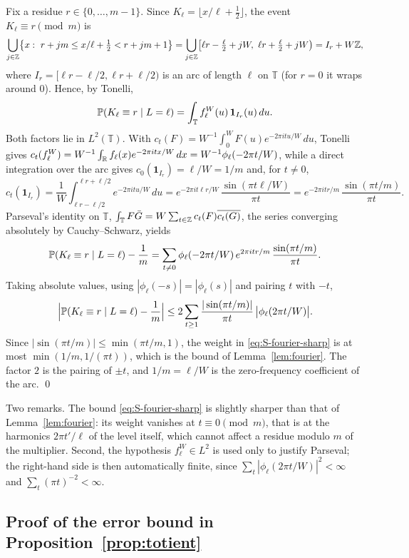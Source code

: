Fix a residue $r\in\{0,\dots,m-1\}$. Since $K_\ell=\lfloor x/\ell+\tfrac12\rfloor$, the event $K_\ell\equiv r\pmod m$ is
\[
\bigcup_{j\in\mathbb{Z}}\bigl\{x:\ r+jm\le x/\ell+\tfrac12<r+jm+1\bigr\}
=\bigcup_{j\in\mathbb{Z}}\bigl[\ell r-\tfrac\ell2+jW,\ \ell r+\tfrac\ell2+jW\bigr)
= I_r+W\mathbb{Z},
\]
where $I_r=[\ell r-\ell/2,\ell r+\ell/2)$ is an arc of length $\ell$ on $\mathbb T$ (for $r=0$ it wraps around $0$). Hence, by Tonelli,
\[
\mathbb{P}(K_\ell\equiv r\mid L=\ell)=\int_{\mathbb T}f^W_\ell(u)\,\mathbf 1_{I_r}(u)\,du .
\]
Both factors lie in $L^2(\mathbb T)$. With $c_t(F)=W^{-1}\int_0^W F(u)e^{-2\pi itu/W}\,du$, Tonelli gives $c_t(f^W_\ell)=W^{-1}\int_{\mathbb{R}} f_\ell(x)e^{-2\pi itx/W}\,dx=W^{-1}\phi_\ell(-2\pi t/W)$, while a direct integration over the arc gives $c_0(\mathbf 1_{I_r})=\ell/W=1/m$ and, for $t\ne0$,
\[
c_t(\mathbf 1_{I_r})=\frac1W\int_{\ell r-\ell/2}^{\ell r+\ell/2}e^{-2\pi itu/W}\,du
=e^{-2\pi it\ell r/W}\,\frac{\sin(\pi t\ell/W)}{\pi t}
=e^{-2\pi itr/m}\,\frac{\sin(\pi t/m)}{\pi t}.
\]
Parseval's identity on $\mathbb T$, $\int_{\mathbb T}F\bar G=W\sum_{t\in\mathbb{Z}}c_t(F)\overline{c_t(G)}$, the series converging absolutely by Cauchy--Schwarz, yields
\[
\mathbb{P}(K_\ell\equiv r\mid L=\ell)-\frac1m=\sum_{t\ne0}\phi_\ell(-2\pi t/W)\,e^{2\pi itr/m}\,\frac{\sin(\pi t/m)}{\pi t}.
\]
Taking absolute values, using $|\phi_\ell(-s)|=|\phi_\ell(s)|$ and pairing $t$ with $-t$,
\begin{equation}\label{eq:S-fourier-sharp}
\Bigl|\mathbb{P}(K_\ell\equiv r\mid L=\ell)-\frac1m\Bigr|\le 2\sum_{t\ge1}\frac{|\sin(\pi t/m)|}{\pi t}\,\bigl|\phi_\ell(2\pi t/W)\bigr| .
\end{equation}
Since $|\sin(\pi t/m)|\le\min(\pi t/m,1)$, the weight in \eqref{eq:S-fourier-sharp} is at most $\min(1/m,1/(\pi t))$, which is the bound of Lemma~\ref{lem:fourier}. The factor $2$ is the pairing of $\pm t$, and $1/m=\ell/W$ is the zero-frequency coefficient of the arc. \qed

Two remarks. The bound \eqref{eq:S-fourier-sharp} is slightly sharper than that of Lemma~\ref{lem:fourier}: its weight vanishes at $t\equiv0\pmod m$, that is at the harmonics $2\pi t'/\ell$ of the level itself, which cannot affect a residue modulo $m$ of the multiplier. Second, the hypothesis $f^W_\ell\in L^2$ is used only to justify Parseval; the right-hand side is then automatically finite, since $\sum_t|\phi_\ell(2\pi t/W)|^2<\infty$ and $\sum_t(\pi t)^{-2}<\infty$.

\subsection{Proof of the error bound in Proposition~\ref{prop:totient}}

